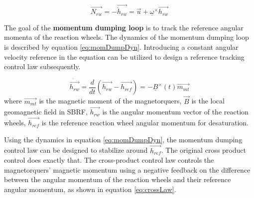 \begin{equation}
\vec{N_{rw}} = -\vec{\dot{h}_{rw}} = \vec{u} +  \underline{\omega}^\times\vec{h_{rw}}
\label{eq:stateComp}
\end{equation}


The goal of the \textbf{momentum dumping loop} is to track the reference angular momenta of the reaction wheels. The dynamics of the momentum dumping loop is described by equation \ref{eq:momDumpDyn}. Introducing a constant angular velocity reference in the equation can be utilized to design a reference tracking control law subsequently.

\begin{equation}
\label{eq:momDumpDyn}
\dot{\vec{h_{rw}}} = \frac{d}{dt}(\vec{h_{rw}} - \vec{h_{ref}}) = -\underline{B}^\times(t) \vec{m_{mt}} 
\end{equation}
where $\vec{m_{mt}}$ is the magnetic moment of the magnetorquers, $\vec{B}$ is the local geomagnetic field in SBRF, $\vec{h_{rw}}$ is the angular momentum vector of the reaction wheels, $\vec{h_{ref}}$ is the reference reaction wheel angular momentum for desaturation.


Using the dynamics in equation \ref{eq:momDumpDyn}, the momentum dumping control law can be designed to stabilize around $\vec{h_{ref}}$. The original cross product control does exactly that.
The cross-product control law controls the magnetorquers' magnetic momentum using a negative feedback on the difference between the angular momentum of the reaction wheels and their reference angular momentum, as shown in equation \ref{eq:crossLaw}.


